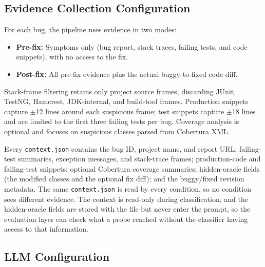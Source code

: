 \documentclass{iutbscthesis}
\begin{document}
\subsection{Evidence Collection Configuration}

For each bug, the pipeline uses evidence in two modes:
\begin{itemize}
    \item \textbf{Pre-fix:} Symptoms only (bug report, stack traces, failing tests, and code snippets), with no access to the fix.
    \item \textbf{Post-fix:} All pre-fix evidence plus the actual buggy-to-fixed code diff.
\end{itemize}

Stack-frame filtering retains only project source frames, discarding JUnit, TestNG, Hamcrest, JDK-internal, and build-tool frames. Production snippets capture $\pm$12 lines around each suspicious frame; test snippets capture $\pm$18 lines and are limited to the first three failing tests per bug. Coverage analysis is optional and focuses on suspicious classes parsed from Cobertura XML.

Every \texttt{context.json} contains the bug ID, project name, and report URL; failing-test summaries, exception messages, and stack-trace frames; production-code and failing-test snippets; optional Cobertura coverage summaries; hidden-oracle fields (the modified classes and the optional fix diff); and the buggy/fixed revision metadata. The same \texttt{context.json} is read by every condition, so no condition sees different evidence. The context is read-only during classification, and the hidden-oracle fields are stored with the file but never enter the prompt, so the evaluation layer can check what a probe reached without the classifier having access to that information.

\subsection{LLM Configuration}
\end{document}
